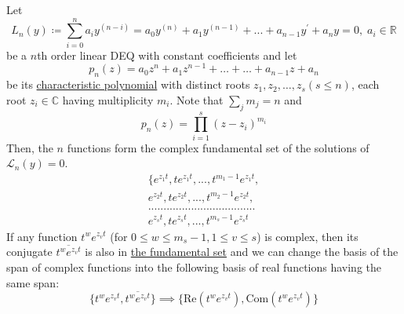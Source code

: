 \documentclass{article}
\newcounter{theorem}[section]
\begin{document}
      \begin{theorem}
        \label{thm:solving-homogeneous-linear-deqs-with-constant}
      Let
      \begin{equation}
        L_n (y) \coloneqq \sum_{i=0}^n a_i y^{(n-i)} = a_0 y^{(n)} + a_1 y^{(n-1)} + ... + a_{n-1} y^\prime + a_n y = 0, \; a_i \in \mathbb{R}
      \end{equation}
      be a $n$th order linear DEQ with constant coefficients and let
      \begin{equation}
        p_n (z) = a_0 z^n + a_1 z^{n-1} + \ldots + \ldots + a_{n-1} z + a_n
      \end{equation}
      be its \hyperref[def:characteristic-polynomial]{characteristic polynomial} with distinct roots $z_1, z_2, \ldots, z_s (s \leq n)$, each root $z_i \in \mathbb{C}$ having multiplicity $m_i$. Note that $\sum_j m_j = n$ and 
      \begin{equation}
        p_n (z) = \prod_{i=1}^s (z - z_i)^{m_i}
      \end{equation}
      Then, the $n$ functions form the complex fundamental set of the solutions of $\mathcal{L}_n (y) = 0$. 
      \begin{align*}
          \{ e^{z_1 t}, t e^{z_1 t}, ..., t^{m_1 - 1} e^{z_1 t},  \\
          e^{z_2 t}, t e^{z_2 t}, ..., t^{m_2 - 1} e^{z_2 t}, \\
          ................................... \\
          e^{z_s t}, t e^{z_s t}, ..., t^{m_s - 1} e^{z_s t}
      \end{align*}
      If any function $t^w e^{z_v t}$ (for $0 \leq w \leq m_s - 1, 1 \leq v \leq s$) is complex, then its conjugate $\overline{t^w e^{z_v t}}$ is also in \hyperref[thm:the-fundamental-set]{the fundamental set} and we can change the basis of the span of complex functions into the following basis of real functions having the same span:
      \begin{equation}
        \{t^w e^{z_v t}, \overline{t^w e^{z_v t}}\} \implies \{\text{Re}(t^w e^{z_v t}), \text{Com}(t^w e^{z_v t})\}
      \end{equation}
      \end{theorem}
\end{document}
